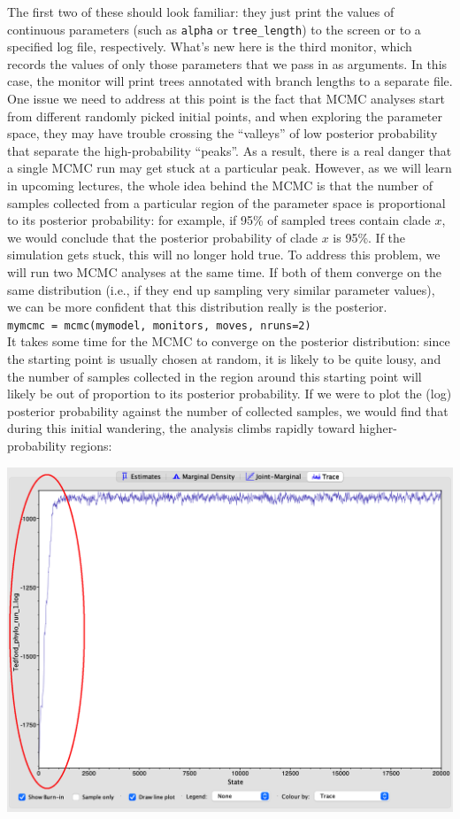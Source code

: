 \documentclass[12pt]{article}
\begin{document}
\noindent The first two of these should look familiar: they just print the values of continuous parameters (such as \texttt{alpha} or \texttt{tree\_length}) to the screen or to a specified log file, respectively. What's new here is the third monitor, which records the values of only those parameters that we pass in as arguments. In this case, the monitor will print trees annotated with branch lengths to a separate file. \\

\noindent One issue we need to address at this point is the fact that MCMC analyses start from different randomly picked initial points, and when exploring the parameter space, they may have trouble crossing the ``valleys'' of low posterior probability that separate the high-probability ``peaks''. As a result, there is a real danger that a single MCMC run may get stuck at a particular peak. However, as we will learn in upcoming lectures, the whole idea behind the MCMC is that the number of samples collected from a particular region of the parameter space is proportional to its posterior probability: for example, if 95\% of sampled trees contain clade $x$, we would conclude that the posterior probability of clade $x$ is 95\%. If the simulation gets stuck, this will no longer hold true. To address this problem, we will run two MCMC analyses at the same time. If both of them converge on the same distribution (i.e., if they end up sampling very similar parameter values), we can be more confident that this distribution really is the posterior. \\

\indent \texttt{mymcmc = mcmc(mymodel, monitors, moves, nruns=2)} \\

\noindent It takes some time for the MCMC to converge on the posterior distribution: since the starting point is usually chosen at random, it is likely to be quite lousy, and the number of samples collected in the region around this starting point will likely be out of proportion to its posterior probability. If we were to plot the (log) posterior probability against the number of collected samples, we would find that during this initial wandering, the analysis climbs rapidly toward higher-probability regions: \\

\begin{center}
\noindent\includegraphics[height=0.54\textwidth]{burnin.png}
\end{center}
\end{document}

